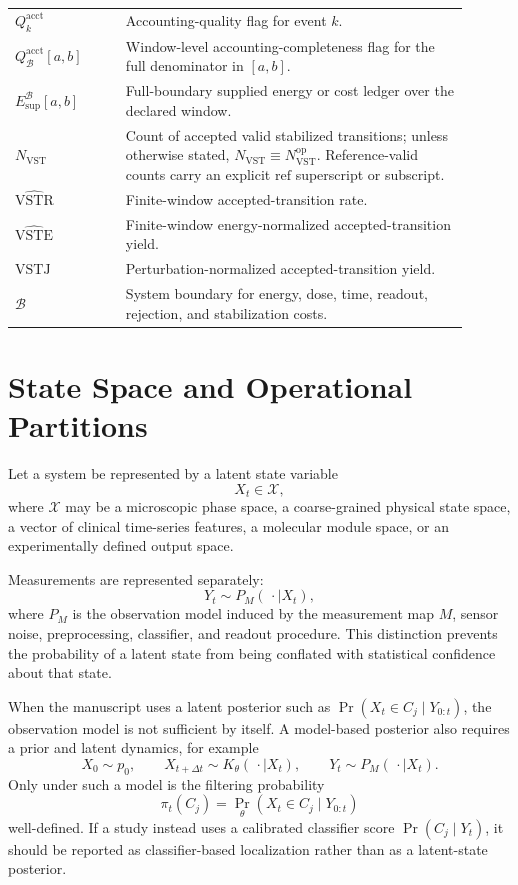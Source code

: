 \documentclass[11pt,a4paper]{article}
\newcommand{\VST}{\ensuremath{\mathrm{VST}}}
\newcommand{\VSTR}{\ensuremath{\mathrm{VSTR}}}
\newcommand{\VSTE}{\ensuremath{\mathrm{VSTE}}}
\newcommand{\VSTJ}{\ensuremath{\mathrm{VSTJ}}}
\newcommand{\1}{\mathbf{1}}
\begin{document}
\begin{table}[h]
\begin{tabular}{p{0.22\linewidth}p{0.68\linewidth}}
$Q_k^{\mathrm{acct}}$ & Accounting-quality flag for event $k$. \\
$Q_{\mathcal{B}}^{\mathrm{acct}}[a,b]$ & Window-level accounting-completeness flag for the full denominator in $[a,b]$. \\
$E_{\mathrm{sup}}^{\mathcal{B}}[a,b]$ & Full-boundary supplied energy or cost ledger over the declared window. \\
$N_{\VST}$ & Count of accepted valid stabilized transitions; unless otherwise stated, $N_{\VST}\equiv N_{\VST}^{\mathrm{op}}$. Reference-valid counts carry an explicit $\mathrm{ref}$ superscript or subscript. \\
$\widehat{\VSTR}$ & Finite-window accepted-transition rate. \\
$\widehat{\VSTE}$ & Finite-window energy-normalized accepted-transition yield. \\
$\VSTJ$ & Perturbation-normalized accepted-transition yield. \\
$\mathcal{B}$ & System boundary for energy, dose, time, readout, rejection, and stabilization costs. \\
\bottomrule
\end{tabular}
\end{table}

\section{State Space and Operational Partitions}

Let a system be represented by a latent state variable
\[
  X_t \in \mathcal{X},
\]
where $\mathcal{X}$ may be a microscopic phase space, a coarse-grained physical state space, a vector of clinical time-series features, a molecular module space, or an experimentally defined output space.

Measurements are represented separately:
\[
  Y_t \sim P_M(\,\cdot \mid X_t),
\]
where $P_M$ is the observation model induced by the measurement map $M$, sensor noise, preprocessing, classifier, and readout procedure. This distinction prevents the probability of a latent state from being conflated with statistical confidence about that state.

When the manuscript uses a latent posterior such as $\Pr(X_t\in C_j\mid Y_{0:t})$, the observation model is not sufficient by itself. A model-based posterior also requires a prior and latent dynamics, for example
\[
  X_0\sim p_0,\qquad
  X_{t+\Delta t}\sim K_\theta(\,\cdot\mid X_t),\qquad
  Y_t\sim P_M(\,\cdot\mid X_t).
\]
Only under such a model is the filtering probability
\[
  \pi_t(C_j)=\Pr_\theta(X_t\in C_j\mid Y_{0:t})
\]
well-defined. If a study instead uses a calibrated classifier score $\Pr(C_j\mid Y_t)$, it should be reported as classifier-based localization rather than as a latent-state posterior.
\end{document}
